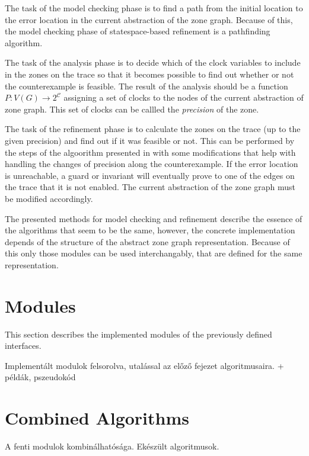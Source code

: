 The task of the model checking phase is to find a path from the initial location to the error location in the current abstraction of the zone graph. Because of this, the model checking phase of statespace-based refinement is a pathfinding algorithm.

The task of the analysis phase is to decide which of the clock variables to include in the zones on the trace so that it becomes possible to find out whether or not the counterexample is feasible. The result of the analysis should be a function $P: V(G) \to 2^\mathcal{C}$ assigning a set of clocks to the nodes of the current abstraction of zone graph. This set of clocks can be callled the \emph{precision} of the zone.

The task of the refinement phase is to calculate the zones on the trace (up to the given precision) and find out if it was feasible or not. This can be performed by the steps of the algoorithm presented in  with some modifications that help with handling the changes of precision along the counterexample. If the error location is unreachable, a guard or invariant will eventually prove to one of the edges on the trace that it is not enabled. The current abstraction of the zone graph must be modified accordingly.


The presented methods for model checking and refinement describe the essence of the algorithms that seem to be the same, however, the concrete implementation depends of the structure of the abstract zone graph representation. Because of this only those modules can be used interchangably, that are defined for the same representation.


\section{Modules}

This section describes the implemented modules of the previously defined interfaces.


Implementált modulok felsorolva, utalással az előző fejezet algoritmusaira. + példák, pszeudokód


\section{Combined Algorithms}
A fenti modulok kombinálhatósága. Ekészült algoritmusok.


